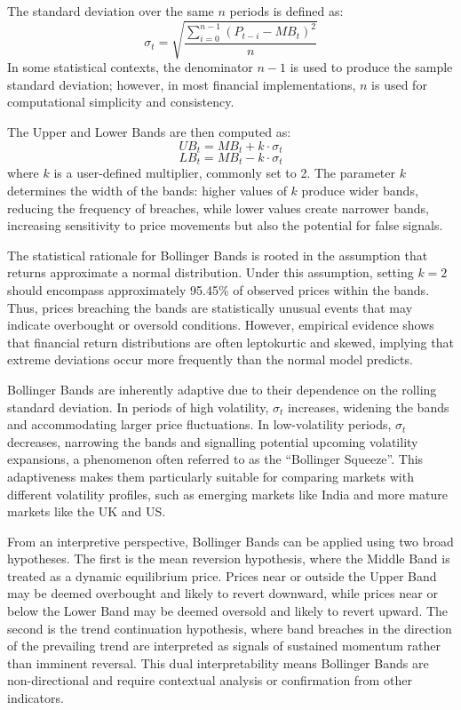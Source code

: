 The standard deviation over the same $n$ periods is defined as:
\[
\sigma_t = \sqrt{\frac{\sum_{i=0}^{n-1} \left(P_{t-i} - MB_t \right)^2}{n}}
\]
In some statistical contexts, the denominator $n-1$ is used to produce the sample standard deviation; however, in most financial implementations, $n$ is used for computational simplicity and consistency.

The Upper and Lower Bands are then computed as:
\[
UB_t = MB_t + k \cdot \sigma_t
\]
\[
LB_t = MB_t - k \cdot \sigma_t
\]
where $k$ is a user-defined multiplier, commonly set to 2. The parameter $k$ determines the width of the bands: higher values of $k$ produce wider bands, reducing the frequency of breaches, while lower values create narrower bands, increasing sensitivity to price movements but also the potential for false signals.

The statistical rationale for Bollinger Bands is rooted in the assumption that returns approximate a normal distribution. Under this assumption, setting $k = 2$ should encompass approximately 95.45\% of observed prices within the bands. Thus, prices breaching the bands are statistically unusual events that may indicate overbought or oversold conditions. However, empirical evidence shows that financial return distributions are often leptokurtic and skewed, implying that extreme deviations occur more frequently than the normal model predicts.

Bollinger Bands are inherently adaptive due to their dependence on the rolling standard deviation. In periods of high volatility, $\sigma_t$ increases, widening the bands and accommodating larger price fluctuations. In low-volatility periods, $\sigma_t$ decreases, narrowing the bands and signalling potential upcoming volatility expansions, a phenomenon often referred to as the ``Bollinger Squeeze''. This adaptiveness makes them particularly suitable for comparing markets with different volatility profiles, such as emerging markets like India and more mature markets like the UK and US.

From an interpretive perspective, Bollinger Bands can be applied using two broad hypotheses. The first is the mean reversion hypothesis, where the Middle Band is treated as a dynamic equilibrium price. Prices near or outside the Upper Band may be deemed overbought and likely to revert downward, while prices near or below the Lower Band may be deemed oversold and likely to revert upward. The second is the trend continuation hypothesis, where band breaches in the direction of the prevailing trend are interpreted as signals of sustained momentum rather than imminent reversal. This dual interpretability means Bollinger Bands are non-directional and require contextual analysis or confirmation from other indicators.

